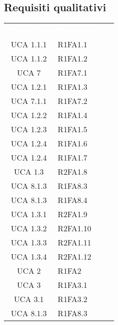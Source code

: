 \subsection{Requisiti qualitativi}
{
\renewcommand{\arraystretch}{1.5}
\centering
\begin{longtable}{ c C{4cm} c c}
\textcolor{white}{\textbf{Caso d'uso}} & \textcolor{white}{\textbf{Requisito}}\\	


UCA 1.1.1 & R1FA1.1\\

UCA 1.1.2 & R1FA1.2\\

UCA 7 & R1FA7.1\\

UCA 1.2.1 & R1FA1.3\\

UCA 7.1.1 & R1FA7.2\\

UCA 1.2.2 & R1FA1.4\\

UCA 1.2.3 & R1FA1.5\\

UCA 1.2.4 & R1FA1.6\\

UCA 1.2.4 & R1FA1.7\\


UCA 1.3 & R2FA1.8\\

UCA 8.1.3 & R1FA8.3\\

UCA 8.1.3 & R1FA8.4\\

UCA 1.3.1 & R2FA1.9\\

UCA 1.3.2 & R2FA1.10\\

UCA 1.3.3 & R2FA1.11\\

UCA 1.3.4 & R2FA1.12\\

UCA 2 & R1FA2\\

UCA 3 & R1FA3.1\\

UCA 3.1 & R1FA3.2\\

UCA 8.1.3 & R1FA8.3\\


\end{longtable}}
